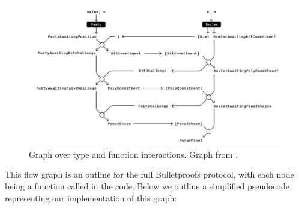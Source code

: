 \documentclass{article}
\begin{document}
\begin{figure}[H]
	\centering
	\includegraphics[scale=0.4]{img/multi-party protocol.png}
	\caption{
		Graph over type and function interactions. Graph from
		\cite{dalek-notes}.
	}
	\label{implementation-graph}
\end{figure}

This flow graph is an outline for the full Bulletproofs protocol, 
with each node being a function called in the code. Below we outline
a simplified pseudocode representing our implementation of this graph:
\end{document}
